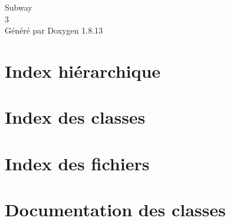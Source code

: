 \documentclass[twoside]{book}
\newcommand{\+}{\discretionary{\mbox{\scriptsize$\hookleftarrow$}}{}{}}
\newcommand{\clearemptydoublepage}{%
  \newpage{\pagestyle{empty}\cleardoublepage}%
}
\begin{document}
\hypersetup{pageanchor=false,
             bookmarksnumbered=true,
             pdfencoding=unicode
            }
\begin{titlepage}
\vspace*{7cm}
\begin{center}%
{\Large Subway \\[1ex]\large 3 }\\
\vspace*{1cm}
{\large Généré par Doxygen 1.8.13}\\
\end{center}
\end{titlepage}
\clearemptydoublepage
{}
\tableofcontents
\clearemptydoublepage
{}
\hypersetup{pageanchor=true}

\chapter{Index hiérarchique}

\chapter{Index des classes}

\chapter{Index des fichiers}

\chapter{Documentation des classes}






























\end{document}
